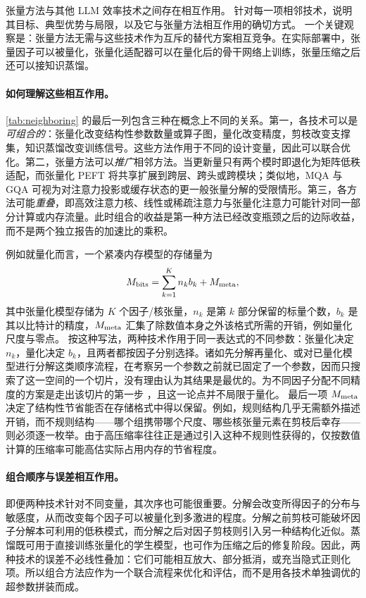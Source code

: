 张量方法与其他 LLM 效率技术之间存在相互作用。 针对每一项相邻技术，说明其目标、典型优势与局限，以及它与张量方法相互作用的确切方式。
一个关键观察是：张量方法无需与这些技术作为互斥的替代方案相互竞争。在实际部署中，张量因子可以被量化，张量化适配器可以在量化后的骨干网络上训练，张量压缩之后还可以接知识蒸馏。

\paragraph{如何理解这些相互作用。}
\cref{tab:neighboring} 的最后一列包含三种在概念上不同的关系。第一，各技术可以是\emph{可组合的}：张量化改变结构性参数数量或算子图，量化改变精度，剪枝改变支撑集，知识蒸馏改变训练信号。这些方法作用于不同的设计变量，因此可以联合优化。第二，张量方法可以\emph{推广}相邻方法。当更新量只有两个模时即退化为矩阵低秩适配，而张量化 PEFT 将共享扩展到跨层、跨头或跨模块；类似地，MQA 与 GQA 可视为对注意力投影或缓存状态的更一般张量分解的受限情形。第三，各方法可能\emph{重叠}，即高效注意力核、线性或稀疏注意力与张量化注意力可能针对同一部分计算或内存流量。此时组合的收益是第一种方法已经改变瓶颈之后的边际收益，而不是两个独立报告的加速比的乘积。

例如就量化而言，一个紧凑内存模型的存储量为
\begin{equation}
\label{eq:memory-budget}
M_{\rm bits} = \sum_{k=1}^{K} n_k b_k + M_{\rm meta},
\end{equation}
其中张量化模型存储为 $K$ 个因子/核张量，$n_k$ 是第 $k$ 部分保留的标量个数，$b_k$ 是其以比特计的精度，$M_{\rm meta}$ 汇集了除数值本身之外该格式所需的开销，例如量化尺度与零点。
按这种写法，两种技术作用于同一表达式的不同参数：张量化决定 $n_k$，量化决定 $b_k$，且两者都按因子分别选择。诸如先分解再量化、或对已量化模型进行分解这类顺序流程，在考察另一个参数之前就已固定了一个参数，因而只搜索了这一空间的一个切片，没有理由认为其结果是最优的。为不同因子分配不同精度的方案是走出该切片的第一步 \cite{liu2024decoquant}，且这一论点并不局限于量化。
最后一项 $M_{\rm meta}$ 决定了结构性节省能否在存储格式中得以保留。例如，规则结构几乎无需额外描述开销，而不规则结构——哪个组携带哪个尺度、哪些核张量元素在剪枝后幸存——则必须逐一枚举。由于高压缩率往往正是通过引入这种不规则性获得的，仅按数值计算的压缩率可能高估实际占用内存的节省程度。

\paragraph{组合顺序与误差相互作用。}
即便两种技术针对不同变量，其次序也可能很重要。分解会改变所得因子的分布与敏感度，从而改变每个因子可以被量化到多激进的程度。分解之前剪枝可能破坏因子分解本可利用的低秩模式，而分解之后对因子剪枝则引入另一种结构化近似。蒸馏既可用于直接训练张量化的学生模型，也可作为压缩之后的修复阶段。因此，两种技术的误差不必线性叠加：它们可能相互放大、部分抵消，或充当隐式正则化项。所以组合方法应作为一个联合流程来优化和评估，而不是用各技术单独调优的超参数拼装而成。

